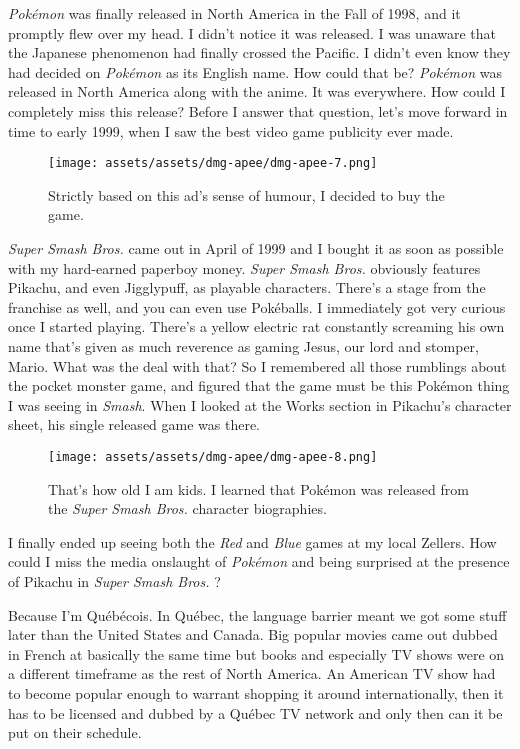 \documentclass{book}
\begin{document}
\emph{Pokémon} was finally released in North America in the Fall of 1998, and it promptly flew over my head. I didn’t notice it was released. I was unaware that the Japanese phenomenon had finally crossed the Pacific. I didn’t even know they had decided on \emph{Pokémon} as its English name. How could that be? \emph{Pokémon} was released in North America along with the anime. It was everywhere. How could I completely miss this release? Before I answer that question, let’s move forward in time to early 1999, when I saw the best video game publicity ever made.

\begin{figure}[hbt]
\vskip 10pt
\centering \texttt{[image: assets/assets/dmg-apee/dmg-apee-7.png]}\par\pagetwodescription Strictly based on this ad’s sense of humour, I decided to buy the game.
\vskip 6pt
\end{figure}

\emph{Super Smash Bros.} came out in April of 1999 and I bought it as soon as possible with my hard-earned paperboy money. \emph{Super Smash Bros.} obviously features Pikachu, and even Jigglypuff, as playable characters. There’s a stage from the franchise as well, and you can even use Pokéballs. I immediately got very curious once I started playing. There’s a yellow electric rat constantly screaming his own name that’s given as much reverence as gaming Jesus, our lord and stomper, Mario. What was the deal with that? So I remembered all those rumblings about the pocket monster game, and figured that the game must be this Pokémon thing I was seeing in \emph{Smash}. When I looked at the Works section in Pikachu’s character sheet, his single released game was there.

\begin{figure}[hbt]
\vskip 10pt
\centering \texttt{[image: assets/assets/dmg-apee/dmg-apee-8.png]}\par\pagetwodescription That’s how old I am kids. I learned that Pokémon was released from the \emph{Super Smash Bros.} character biographies.
\vskip 6pt
\end{figure}

I finally ended up seeing both the \emph{Red} and \emph{Blue} games at my local Zellers. How could I miss the media onslaught of \emph{Pokémon} and being surprised at the presence of Pikachu in \emph{Super Smash Bros.} ?

Because I’m Québécois. In Québec, the language barrier meant we got some stuff later than the United States and Canada. Big popular movies came out dubbed in French at basically the same time but books and especially TV shows were on a different timeframe as the rest of North America. An American TV show had to become popular enough to warrant shopping it around internationally, then it has to be licensed and dubbed by a Québec TV network and only then can it be put on their schedule.
\end{document}
